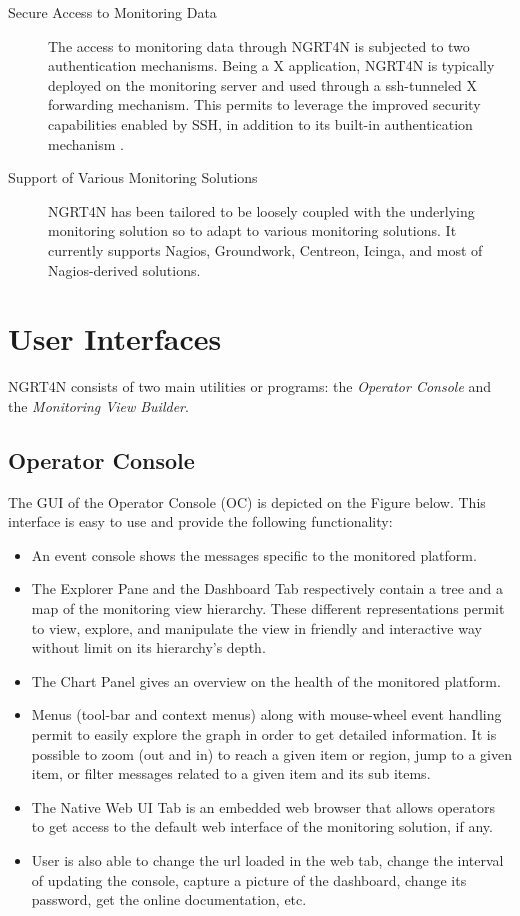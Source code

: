 \documentclass[a4paper,9pt]{article}
\begin{document}
\begin{description}
        \item [Secure Access to Monitoring Data]
        The access to monitoring data through NGRT4N is subjected to two authentication mechanisms. Being a X application, NGRT4N is typically deployed on the monitoring server and used through a ssh-tunneled X forwarding mechanism. This permits to leverage the improved security capabilities enabled by SSH, in addition to its built-in authentication mechanism . 
        \item [Support of Various Monitoring Solutions] 
        NGRT4N has been tailored to be loosely coupled with the underlying monitoring solution so to adapt to  various monitoring solutions. It currently supports Nagios, Groundwork, Centreon, Icinga, and most of Nagios-derived solutions.
\end{description}


\section{User Interfaces}
NGRT4N consists of two main utilities or programs: the \emph{Operator Console} and the \emph{Monitoring View Builder}.

\subsection{Operator Console}
The GUI of the Operator Console (OC) is depicted on the Figure below. This interface is easy to use and provide the following functionality:
\begin{itemize}
        \item An event console shows the messages specific to the monitored platform.
        \item The Explorer Pane and the Dashboard Tab respectively contain a tree and a map of the monitoring view hierarchy. These different representations permit to view, explore, and manipulate the view in friendly and interactive way without limit on its hierarchy's depth.
        \item The Chart Panel gives an overview on the health of the monitored platform.
        \item Menus (tool-bar and context menus) along with mouse-wheel event handling permit to easily explore the graph in order to get detailed information. It is possible to zoom (out and in) to reach a given item or region, jump to a given item, or filter messages related to a given item and its sub items. 
        \item The Native Web UI Tab is an embedded web browser that allows operators to get access to the default web interface of the monitoring solution, if any. 
        \item User is also able to change the url loaded in the web tab, change the interval of updating the console, capture a picture of the dashboard, change its password, get the online documentation, etc.
\end{itemize}
\end{document}
